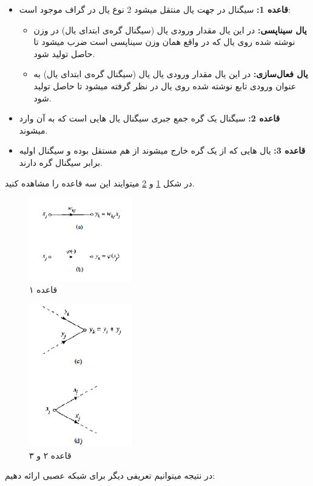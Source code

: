 \documentclass[11pt,a4paper,twocolumn]{article}
\begin{document}
\begin{itemize}
	\item
\textbf{قاعده 1:}
سیگنال در جهت یال منتقل میشود  2 نوع یال در گراف موجود است:
\begin{itemize}
	\item
\textbf{یال سیناپسی:}
در این یال مقدار ورودی یال (سیگنال گره‌ی ابتدای یال) در وزن نوشته شده روی یال که در واقع همان وزن سیناپسی است ضرب میشود تا حاصل تولید شود.
\item
\textbf{یال فعال‌سازی:}
در این یال مقدار ورودی یال یال (سیگنال گره‌ی ابتدای یال) به عنوان ورودی تابع نوشته شده روی یال در نظر گرفته میشود تا حاصل تولید شود.
\end{itemize}
\item
\textbf{قاعده 2:}
سیگنال یک گره جمع جبری سیگنال یال هایی است که به آن وارد میشوند.
\item
\textbf{قاعده 3:}
یال هایی که از یک گره خارج میشوند از هم مستقل بوده و سیگنال اولیه برابر سیگنال گره دارند.
\end{itemize}
در شکل
\ref{fig:type-1}
و
\ref{fig:type-2}
میتوایند این سه قاعده را مشاهده کنید.	
\begin{figure}
  \centering
    \includegraphics[width=0.4\textwidth]{type-1.png}
  \caption{قاعده‌ ۱}
  \label{fig:type-1}
\end{figure}

\begin{figure}
  \centering
    \includegraphics[width=0.4\textwidth]{type-2.png}
  \caption{قاعده ۲ و ۳}
  \label{fig:type-2}
\end{figure}
در نتیجه میتوانیم تعریفی دیگر\cite{haykin}
 برای شبکه عصبی ارائه دهیم:
\\
\end{document}
